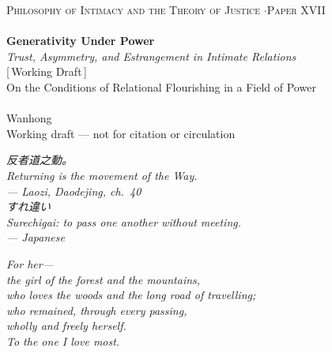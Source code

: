 \documentclass[11pt,a4paper]{article}
\begin{document}
\thispagestyle{empty}
\begin{center}
\vspace*{2cm}
{\footnotesize\color{rosedeep}\scshape Philosophy of Intimacy and the Theory of Justice \quad$\cdot$\quad Paper XVII}\\[0.3cm]
\coverrule\\[1.2cm]
{\LARGE\bfseries\color{warnred} Generativity Under Power}\\[0.7cm]
{\large\itshape\color{warnred} Trust, Asymmetry, and Estrangement in Intimate Relations}\\[0.8cm]
{\small\color{gold} [\,Working Draft\,]}\\[0.8cm]
{\normalsize\color{inksoft} On the Conditions of Relational Flourishing in a Field of Power}\\[2cm]
\coverrule[0.25]\\[0.6cm]
{\normalsize\color{inksoft} Wanhong}\\
\vfill
{\footnotesize\color{gold} Working draft --- not for citation or circulation}
\coverfootnote
\end{center}
\newpage

\thispagestyle{empty}
\vspace*{2.4cm}
\begin{center}
\begin{minipage}{0.74\linewidth}
\centering\itshape\color{rose}
{\cjk 反者道之動。}\\[0.3em]
Returning is the movement of the Way.\\[0.6em]
{\upshape\footnotesize\color{gold} --- Laozi, \emph{Daodejing}, ch.~40}\\[1.2em]
\itshape
{\cjk すれ違い}\\[0.3em]
\emph{Surechigai}: to pass one another without meeting.\\[0.6em]
{\upshape\footnotesize\color{gold} --- Japanese}
\end{minipage}
\end{center}
\newpage

\thispagestyle{empty}
\vspace*{4.5cm}
\begin{center}
\begin{minipage}{0.7\linewidth}
\centering\itshape\color{rose}
For her---\\[0.7em]
\upshape the girl of the forest and the mountains,\\[0.3em]
who loves the woods and the long road of travelling;\\[0.7em]
\itshape who remained, through every passing,\\[0.3em]
wholly and freely herself.\\[1.0em]
{\upshape\footnotesize\color{gold} To the one I love most.}
\end{minipage}
\end{center}
\newpage
\end{document}
